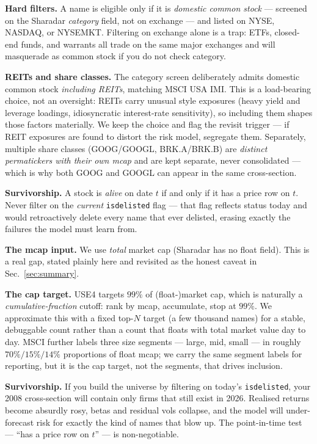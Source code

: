 \documentclass[11pt]{article}
\theoremstyle{definition}
\theoremstyle{plain}
\theoremstyle{remark}
\begin{document}
\textbf{Hard filters.} A name is eligible only if it is \emph{domestic common stock} --- screened on the Sharadar \emph{category} field, not on exchange --- and listed on NYSE, NASDAQ, or NYSEMKT. Filtering on exchange alone is a trap: ETFs, closed-end funds, and warrants all trade on the same major exchanges and will masquerade as common stock if you do not check category.

\textbf{REITs and share classes.} The category screen deliberately admits domestic common stock \emph{including REITs}, matching MSCI USA IMI. This is a load-bearing choice, not an oversight: REITs carry unusual style exposures (heavy yield and leverage loadings, idiosyncratic interest-rate sensitivity), so including them shapes those factors materially. We keep the choice and flag the revisit trigger --- if REIT exposures are found to distort the risk model, segregate them. Separately, multiple share classes (GOOG/GOOGL, BRK.A/BRK.B) are \emph{distinct permatickers with their own mcap} and are kept separate, never consolidated --- which is why both GOOG and GOOGL can appear in the same cross-section.

\textbf{Survivorship.} A stock is \emph{alive} on date $t$ if and only if it has a price row on $t$. Never filter on the \emph{current} \texttt{isdelisted} flag --- that flag reflects status today and would retroactively delete every name that ever delisted, erasing exactly the failures the model must learn from.

\textbf{The mcap input.} We use \emph{total} market cap (Sharadar has no float field). This is a real gap, stated plainly here and revisited as the honest caveat in Sec.\ \ref{sec:summary}.

\textbf{The cap target.} USE4 targets $99\%$ of (float-)market cap, which is naturally a \emph{cumulative-fraction} cutoff: rank by mcap, accumulate, stop at $99\%$. We approximate this with a fixed top-$N$ target (a few thousand names) for a stable, debuggable count rather than a count that floats with total market value day to day. MSCI further labels three size segments --- large, mid, small --- in roughly $70\%/15\%/14\%$ proportions of float mcap; we carry the same segment labels for reporting, but it is the cap target, not the segments, that drives inclusion.

\begin{pitfall}
\textbf{Survivorship.} If you build the universe by filtering on today's \texttt{isdelisted}, your 2008 cross-section will contain only firms that still exist in 2026. Realised returns become absurdly rosy, betas and residual vols collapse, and the model will under-forecast risk for exactly the kind of names that blow up. The point-in-time test --- ``has a price row on $t$'' --- is non-negotiable.
\end{pitfall}
\end{document}

